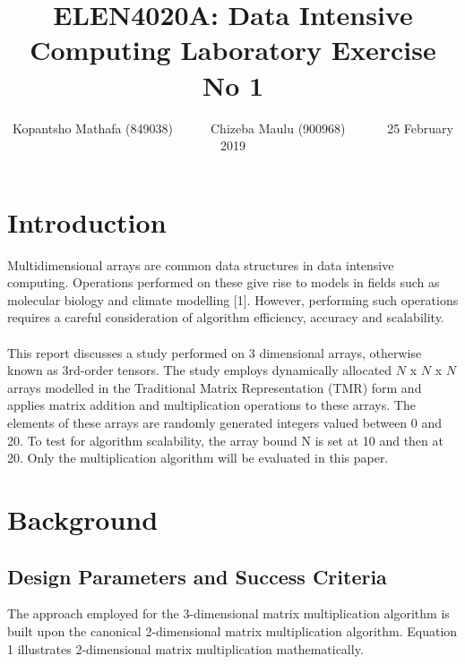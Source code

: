 \documentclass[a4paper, 11pt, onecolumn, conference]{IEEEtran}      %
\title{\LARGE \bf
ELEN4020A: Data Intensive Computing Laboratory Exercise No 1
}
\author{ Kopantsho Mathafa (849038)\ \ \ \ \ \ Chizeba Maulu (900968) \ \ \ \ \ \ 25 February 2019\\
}
\begin{document}
\maketitle

\section{Introduction}
Multidimensional arrays are common data structures in data intensive computing. Operations performed on these give rise to models in fields such as molecular biology and climate modelling [1]. However, performing such operations requires a careful consideration of algorithm efficiency, accuracy and scalability. 
\\\\
This report discusses a study performed on 3 dimensional arrays, otherwise known as 3rd-order tensors. The study employs dynamically allocated $N$ x $N$ x $N$ arrays modelled in the Traditional Matrix Representation (TMR) form and applies matrix addition and multiplication operations to these arrays. The elements of these arrays are randomly generated integers valued between 0 and 20. To test for algorithm scalability, the array bound N is set at 10 and then at 20. Only the multiplication algorithm will be evaluated in this paper. 

\section{Background}
\subsection{Design Parameters and Success Criteria}

The approach employed for the 3-dimensional matrix multiplication algorithm is built upon the canonical 2-dimensional matrix multiplication algorithm. Equation 1 illustrates 2-dimensional matrix multiplication mathematically. 
\end{document}

